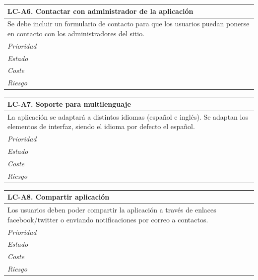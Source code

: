 	\begin{center}
		\begin{tabularx}{15cm}{|X|}
			\hline 
				\bf{LC-A6. Contactar con administrador de la aplicación}\\
			\hline
				Se debe incluir un formulario de contacto para que los usuarios puedan ponerse en contacto con los administradores del sitio.\\
			\hline
				\it{Prioridad}\\
			\hline
				\it{Estado}\\
			\hline
				\it{Coste}\\
			\hline
				\it{Riesgo}\\
			\hline
		\end{tabularx}
	\end{center}
	
	\begin{center}
		\begin{tabularx}{15cm}{|X|}
			\hline 
				\bf{LC-A7. Soporte para multilenguaje}\\
			\hline
				La aplicación se adaptará a distintos idiomas (español e inglés). Se adaptan los elementos de interfaz, siendo el idioma por defecto el español.\\
			\hline
				\it{Prioridad}\\
			\hline
				\it{Estado}\\
			\hline
				\it{Coste}\\
			\hline
				\it{Riesgo}\\
			\hline
		\end{tabularx}
	\end{center}
	
	\begin{center}
		\begin{tabularx}{15cm}{|X|}
			\hline 
				\bf{LC-A8. Compartir aplicación}\\
			\hline
				Los usuarios deben poder compartir la aplicación a través de enlaces facebook/twitter o enviando notificaciones por correo a contactos.\\
			\hline
				\it{Prioridad}\\
			\hline
				\it{Estado}\\
			\hline
				\it{Coste}\\
			\hline
				\it{Riesgo}\\
			\hline
		\end{tabularx}
	\end{center}
	

